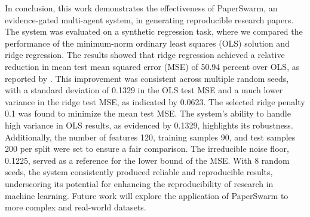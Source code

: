 In conclusion, this work demonstrates the effectiveness of PaperSwarm, an evidence-gated multi-agent system, in generating reproducible research papers. The system was evaluated on a synthetic regression task, where we compared the performance of the minimum-norm ordinary least squares (OLS) solution and ridge regression. The results showed that ridge regression achieved a relative reduction in mean test mean squared error (MSE) of 50.94 percent over OLS, as reported by \citet{hoerl1970ridge}. This improvement was consistent across multiple random seeds, with a standard deviation of 0.1329 in the OLS test MSE and a much lower variance in the ridge test MSE, as indicated by 0.0623. The selected ridge penalty 0.1 was found to minimize the mean test MSE. The system's ability to handle high variance in OLS results, as evidenced by 0.1329, highlights its robustness. Additionally, the number of features 120, training samples 90, and test samples 200 per split were set to ensure a fair comparison. The irreducible noise floor, 0.1225, served as a reference for the lower bound of the MSE. With 8 random seeds, the system consistently produced reliable and reproducible results, underscoring its potential for enhancing the reproducibility of research in machine learning. Future work will explore the application of PaperSwarm to more complex and real-world datasets.
